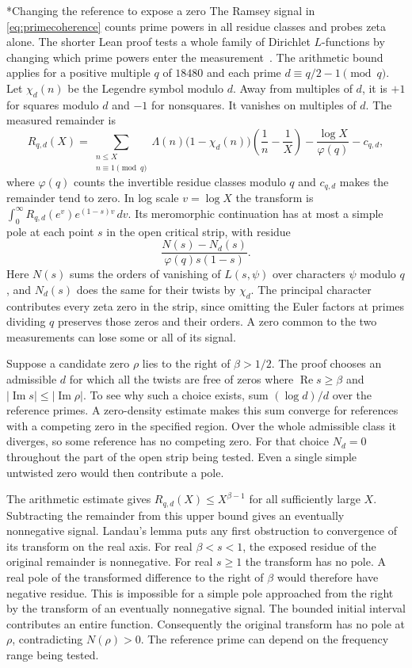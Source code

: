 \documentclass[11pt,letterpaper]{article}
\makeatletter
\renewcommand\subsection{\@startsection{subsection}{2}{\z@}{-2.0ex plus -.3ex}{.75ex}{\normalfont\normalsize\itshape}}
\numberwithin{equation}{section}
\makeatother
\begin{document}
\subsection*{Changing the reference to expose a zero}\label{app:twisted-reference}
The Ramsey signal in \eqref{eq:primecoherence} counts prime powers in all residue classes and probes zeta alone. The shorter Lean proof tests a whole family of Dirichlet $L$-functions by changing which prime powers enter the measurement~\cite{twistlean}. The arithmetic bound applies for a positive multiple $q$ of $18480$ and each prime $d\equiv q/2-1\pmod q$. Let $\chi_d(n)$ be the Legendre symbol modulo $d$. Away from multiples of $d$, it is $+1$ for squares modulo $d$ and $-1$ for nonsquares. It vanishes on multiples of $d$. The measured remainder is
\[
 R_{q,d}(X)=
 \sum_{\substack{n\le X\\ n\equiv1\pmod q}}
 \Lambda(n)\bigl(1-\chi_d(n)\bigr)
       \left(\frac1n-\frac1X\right)
 -\frac{\log X}{\varphi(q)}-c_{q,d},
\]
where $\varphi(q)$ counts the invertible residue classes modulo $q$ and $c_{q,d}$ makes the remainder tend to zero. In log scale $v=\log X$ the transform is $\int_0^\infty R_{q,d}(e^v)e^{(1-s)v}\,dv$. Its meromorphic continuation has at most a simple pole at each point $s$ in the open critical strip, with residue
\[
 \frac{N(s)-N_d(s)}{\varphi(q)s(1-s)}.
\]
Here $N(s)$ sums the orders of vanishing of $L(s,\psi)$ over characters $\psi$ modulo $q$, and $N_d(s)$ does the same for their twists by $\chi_d$. The principal character contributes every zeta zero in the strip, since omitting the Euler factors at primes dividing $q$ preserves those zeros and their orders. A zero common to the two measurements can lose some or all of its signal.

Suppose a candidate zero $\rho$ lies to the right of $\beta>1/2$. The proof chooses an admissible $d$ for which all the twists are free of zeros where $\operatorname{Re}s\ge\beta$ and $|\operatorname{Im}s|\le|\operatorname{Im}\rho|$. To see why such a choice exists, sum $(\log d)/d$ over the reference primes. A zero-density estimate makes this sum converge for references with a competing zero in the specified region. Over the whole admissible class it diverges, so some reference has no competing zero. For that choice $N_d=0$ throughout the part of the open strip being tested. Even a single simple untwisted zero would then contribute a pole.

The arithmetic estimate gives $R_{q,d}(X)\le X^{\beta-1}$ for all sufficiently large $X$. Subtracting the remainder from this upper bound gives an eventually nonnegative signal. Landau's lemma puts any first obstruction to convergence of its transform on the real axis. For real $\beta<s<1$, the exposed residue of the original remainder is nonnegative. For real $s\ge1$ the transform has no pole. A real pole of the transformed difference to the right of $\beta$ would therefore have negative residue. This is impossible for a simple pole approached from the right by the transform of an eventually nonnegative signal. The bounded initial interval contributes an entire function. Consequently the original transform has no pole at $\rho$, contradicting $N(\rho)>0$. The reference prime can depend on the frequency range being tested.
\end{document}
